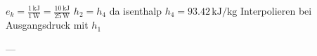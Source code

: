 \( e_k = \frac{1 \, \text{kJ}}{1 \, \text{W}} = \frac{10 \, \text{kJ}}{25 \, \text{W}} \)  
\( h_2 = h_4 \) da isenthalp  
\( h_4 = 93.42 \, \text{kJ/kg} \)  
Interpolieren bei Ausgangsdruck mit \( h_1 \)  

---